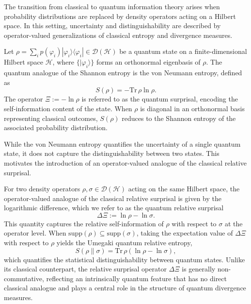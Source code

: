 \documentclass[a4paper, amsfonts, amssymb, amsmath, reprint, showkeys, nofootinbib, twoside, aps, pra]{revtex4-2}
\theoremstyle{definition}
\begin{document}
The transition from classical to quantum information theory arises when probability
distributions are replaced by density operators acting on a Hilbert space.
In this setting, uncertainty and distinguishability are described by operator-valued
generalizations of classical entropy and divergence measures.

Let $\rho = \sum_i p(\varphi_i) |\varphi_i \rangle \langle \varphi_i| \in \mathcal{D}(\mathcal{H})$
be a quantum state on a finite-dimensional Hilbert space $\mathcal{H}$, where
$\{|\varphi_i\rangle\}$ forms an orthonormal eigenbasis of $\rho$.
The quantum analogue of the Shannon entropy is the von Neumann entropy,
defined as
\begin{equation}\label{QE}
S(\rho) = -\mathrm{Tr}\,\rho \ln \rho.
\end{equation}
The operator $\Xi := -\ln \rho$ is referred to as the quantum surprisal, encoding the self-information content of the state.
When $\rho$ is diagonal in an orthonormal basis representing classical outcomes, $S(\rho)$ reduces to the Shannon entropy of the associated probability distribution.

While the von Neumann entropy quantifies the uncertainty of a single quantum state,
it does not capture the distinguishability between two states.
This motivates the introduction of an operator-valued analogue of the classical
relative surprisal.

For two density operators $\rho, \sigma \in \mathcal{D}(\mathcal{H})$ acting on the same Hilbert space, the operator-valued analogue of the classical relative surprisal is given by the logarithmic difference, which we refer to as the quantum relative surprisal~\cite{Boes2022}
\begin{equation}\label{QRsurprisal}
\Delta \Xi := \ln \rho - \ln \sigma.
\end{equation}
This quantity captures the relative self-information of $\rho$ with respect to $\sigma$
at the operator level.
When $\mathrm{supp}(\rho) \subseteq \mathrm{supp}(\sigma)$, taking the expectation value
of $\Delta \Xi$ with respect to $\rho$ yields the Umegaki quantum relative entropy,
\begin{equation}\label{QRE}
S(\rho \| \sigma)
=\mathrm{Tr}\,\rho(\ln \rho - \ln \sigma),
\end{equation}
which quantifies the statistical distinguishability between quantum states.
Unlike its classical counterpart, the relative surprisal operator $\Delta \Xi$ is
generally non-commutative, reflecting an intrinsically quantum feature that has no
direct classical analogue and plays a central role in the structure of quantum
divergence measures.
\end{document}
